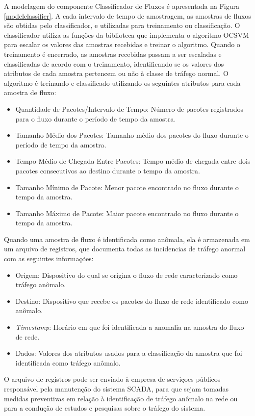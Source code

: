 \documentclass[cic,tc]{iiufrgs}
\begin{document}
A modelagem do componente Classificador de Fluxos é apresentada na Figura \ref{modelclassifier}. A cada intervalo de tempo de amostragem, as amostras de fluxos são obtidas pelo classificador, e utilizadas para treinamento ou classificação. O classificador utiliza as funções da biblioteca que implementa o algoritmo OCSVM para escalar os valores das amostras recebidas e treinar o algoritmo. Quando o treinamento é encerrado, as amostras recebidas passam a ser escaladas e classificadas de acordo com o treinamento, identificando se os valores dos atributos de cada amostra pertencem ou não à classe de tráfego normal. O algoritmo é treinando e classificado utilizando os seguintes atributos para cada amostra de fluxo: 
\begin{itemize}
\item{Quantidade de Pacotes/Intervalo de Tempo}: Número de pacotes registrados para o fluxo durante o período de tempo da amostra.
\item{Tamanho Médio dos Pacotes}: Tamanho médio dos pacotes do fluxo durante o período de tempo da amostra.
\item{Tempo Médio de Chegada Entre Pacotes}: Tempo médio de chegada entre dois pacotes consecutivos ao destino durante o tempo da amostra.
\item{Tamanho Mínimo de Pacote}: Menor pacote encontrado no fluxo durante o tempo da amostra.
\item{Tamanho Máximo de Pacote}: Maior pacote encontrado no fluxo durante o tempo da amostra.
\end{itemize}
Quando uma amostra de fluxo é identificada como anômala, ela é armazenada em um arquivo de registros, que documenta todas as incidencias de tráfego anormal com as seguintes informações:
\begin{itemize}
\item{Origem}: Dispositivo do qual se origina o fluxo de rede caracterizado como tráfego anômalo.
\item{Destino}: Dispositivo que recebe os pacotes do fluxo de rede identificado como anômalo.
\item{\emph{Timestamp}}: Horário em que foi identificada a anomalia na amostra do fluxo de rede.
\item{Dados}: Valores dos atributos usados para a classificação da amostra que foi identificada como tráfego anômalo.
\end{itemize}
O arquivo de registros pode ser enviado à empresa de serviçoes públicos responsável pela manutenção do sistema SCADA, para que sejam tomadas medidas preventivas em relação à identificação de tráfego anômalo na rede ou para a condução de estudos e pesquisas sobre o tráfego do sistema.
\end{document}
